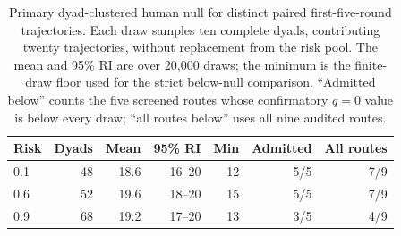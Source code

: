 \documentclass{article}
\begin{document}
\begin{table}[t]
    \caption{Primary dyad-clustered human null for distinct paired
    first-five-round trajectories. Each draw samples ten complete dyads,
    contributing twenty trajectories, without replacement from the risk pool.
    The mean and 95\% RI are over 20{,}000 draws; the minimum is the finite-draw
    floor used for the strict below-null comparison. ``Admitted below'' counts
    the five screened routes whose confirmatory $q{=}0$ value is below every
    draw; ``all routes below'' uses all nine audited routes.}
    \label{tab:diversity-dyad-primary}
    \centering
    \small
    \setlength{\tabcolsep}{4pt}
    \begin{tabular}{@{}lrrrrrr@{}}
        \toprule
        Risk & Dyads & Mean & 95\% RI & Min & Admitted & All routes \\
        \midrule
        0.1 & 48 & 18.6 & 16--20 & 12 & 5/5 & 7/9 \\
        0.6 & 52 & 19.6 & 18--20 & 15 & 5/5 & 7/9 \\
        0.9 & 68 & 19.2 & 17--20 & 13 & 3/5 & 4/9 \\
        \bottomrule
    \end{tabular}
\end{table}
\end{document}
